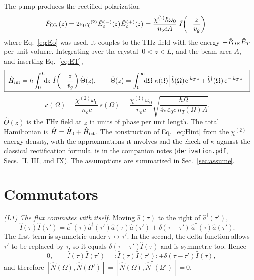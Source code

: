 \documentclass[aps,pra,onecolumn,notitlepage,11pt,amsmath,amssymb,nofootinbib]{revtex4-2}
\newcommand{\Nop}{\hat N}
\newcommand{\Iop}{\hat I}
\newcommand{\dd}{\mathrm{d}}
\newcommand{\ee}{\mathrm{e}}
\newcommand{\ii}{\mathrm{i}}
\begin{document}
The pump produces the rectified polarization
\begin{equation}
\hat P_{\rm OR}(z)=2\varepsilon_0\chi^{(2)}\hat E_o^{(-)}(z)\hat E_o^{(+)}(z)
=\frac{\chi^{(2)}\hbar\omega_0}{n_ocA}\;\Iop\!\left(-\frac{z}{v_g}\right),
\end{equation}
where Eq.~\eqref{eq:Eo} was used. It couples to the THz field with the energy
$-\hat P_{\rm OR}\hat E_T$ per unit volume. Integrating over the crystal,
$0<z<L$, and the beam area $A$, and inserting Eq.~\eqref{eq:ET},
\begin{equation}
\boxed{\;\hat H_{\rm int}=\hbar\int_0^L\!\!\dd z\;\Iop\!\left(-\frac{z}{v_g}\right)\hat\Theta(z),\qquad
\hat\Theta(z)=\int_0^\infty\!\!\dd\Omega\;\kappa(\Omega)\Big[\hat b(\Omega)\,\ee^{\ii k_Tz}
+\hat b^\dagger(\Omega)\,\ee^{-\ii k_Tz}\Big]\;}
\label{eq:Hint}
\end{equation}
\begin{equation}
\kappa(\Omega)=\frac{\chi^{(2)}\omega_0}{n_oc}\,s(\Omega)
=\frac{\chi^{(2)}\omega_0}{n_oc}\sqrt{\frac{\hbar\Omega}{4\pi\varepsilon_0c\,n_T(\Omega)A}} .
\label{eq:kappa}
\end{equation}
$\hat\Theta(z)$ is the THz field at $z$ in units of phase per unit length.
The total Hamiltonian is $\hat H=\hat H_0+\hat H_{\rm int}$. The construction
of Eq.~\eqref{eq:Hint} from the $\chi^{(2)}$ energy density, with the
approximations it involves and the check of $\kappa$ against the classical
rectification formula, is in the companion notes (\texttt{derivation.pdf},
Secs.~II, III, and IX). The assumptions are summarized in
Sec.~\ref{sec:assume}.

\section{Commutators}
\label{sec:comm}

\emph{(L1) The flux commutes with itself.} Moving $\hat a(\tau)$ to the right
of $\hat a^\dagger(\tau')$,
\begin{equation}
\Iop(\tau)\Iop(\tau')
=\hat a^\dagger(\tau)\hat a^\dagger(\tau')\hat a(\tau)\hat a(\tau')
+\delta(\tau-\tau')\,\hat a^\dagger(\tau)\hat a(\tau').
\end{equation}
The first term is symmetric under $\tau\leftrightarrow\tau'$. In the second,
the delta function allows $\tau'$ to be replaced by $\tau$, so it equals
$\delta(\tau-\tau')\Iop(\tau)$ and is symmetric too. Hence
\begin{equation}
[\Iop(\tau),\Iop(\tau')]=0,\qquad
\Iop(\tau)\Iop(\tau')={:}\Iop(\tau)\Iop(\tau'){:}+\delta(\tau-\tau')\Iop(\tau),
\label{eq:L1}
\end{equation}
and therefore
$[\Nop(\Omega),\Nop(\Omega')]=[\Nop(\Omega),\Nop^\dagger(\Omega')]=0$.
\end{document}
